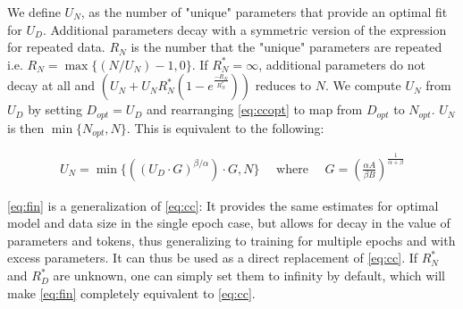 \documentclass{article}
\begin{document}
We define $U_N$, as the number of "unique" parameters that provide an optimal fit for $U_D$. Additional parameters decay with a symmetric version of the expression for repeated data. $R_N$ is the number that the "unique" parameters are repeated i.e. $R_N = \max\{(N / U_N) - 1, 0\}$. If $R_N^*=\infty$, additional parameters do not decay at all and $(U_N + U_N R_N^* (1 - e^{\frac{-R_N}{R_N^*}}))$ reduces to $N$. We compute $U_N$ from $U_D$ by setting $D_{opt}=U_D$ and rearranging \autoref{eq:ccopt} to map from $D_{opt}$ to $N_{opt}$. $U_N$ is then $\min\{N_{opt}, N\}$. This is equivalent to the following:

\begin{equation}\label{eq:optunud}
\begin{aligned}
U_N = \min\{ ((U_D \cdot G)^{\beta/\alpha}) \cdot G, N \}
\quad \text{ where } \quad G = {\left(\frac{\alpha A}{\beta B} \right)}^{\frac{1}{\alpha + \beta}}
\end{aligned}
\end{equation}


\autoref{eq:fin} is a generalization of \autoref{eq:cc}: It provides the same estimates for optimal model and data size in the single epoch case, but allows for decay in the value of parameters and tokens, thus generalizing to training for multiple epochs and with excess parameters. It can thus be used as a direct replacement of \autoref{eq:cc}. If $R_N^*$ and $R_D^*$ are unknown, one can simply set them to infinity by default, which will make \autoref{eq:fin} completely equivalent to \autoref{eq:cc}.
\end{document}
